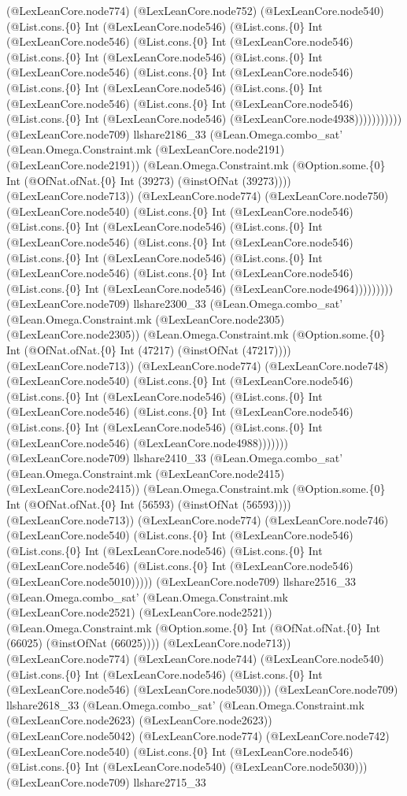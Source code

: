 \documentclass[11pt]{article}
\begin{document}
(@LexLeanCore.node774) (@LexLeanCore.node752) (@LexLeanCore.node540) (@List.cons.\{0\} Int (@LexLeanCore.node546) (@List.cons.\{0\} Int (@LexLeanCore.node546) (@List.cons.\{0\} Int (@LexLeanCore.node546) (@List.cons.\{0\} Int (@LexLeanCore.node546) (@List.cons.\{0\} Int (@LexLeanCore.node546) (@List.cons.\{0\} Int (@LexLeanCore.node546) (@List.cons.\{0\} Int (@LexLeanCore.node546) (@List.cons.\{0\} Int (@LexLeanCore.node546) (@List.cons.\{0\} Int (@LexLeanCore.node546) (@List.cons.\{0\} Int (@LexLeanCore.node546) (@LexLeanCore.node4938))))))))))) (@LexLeanCore.node709) llshare2186\_33 (@Lean.Omega.combo\_sat' (@Lean.Omega.Constraint.mk (@LexLeanCore.node2191) (@LexLeanCore.node2191)) (@Lean.Omega.Constraint.mk (@Option.some.\{0\} Int (@OfNat.ofNat.\{0\} Int (39273) (@instOfNat (39273)))) (@LexLeanCore.node713)) (@LexLeanCore.node774) (@LexLeanCore.node750) (@LexLeanCore.node540) (@List.cons.\{0\} Int (@LexLeanCore.node546) (@List.cons.\{0\} Int (@LexLeanCore.node546) (@List.cons.\{0\} Int (@LexLeanCore.node546) (@List.cons.\{0\} Int (@LexLeanCore.node546) (@List.cons.\{0\} Int (@LexLeanCore.node546) (@List.cons.\{0\} Int (@LexLeanCore.node546) (@List.cons.\{0\} Int (@LexLeanCore.node546) (@List.cons.\{0\} Int (@LexLeanCore.node546) (@LexLeanCore.node4964))))))))) (@LexLeanCore.node709) llshare2300\_33 (@Lean.Omega.combo\_sat' (@Lean.Omega.Constraint.mk (@LexLeanCore.node2305) (@LexLeanCore.node2305)) (@Lean.Omega.Constraint.mk (@Option.some.\{0\} Int (@OfNat.ofNat.\{0\} Int (47217) (@instOfNat (47217)))) (@LexLeanCore.node713)) (@LexLeanCore.node774) (@LexLeanCore.node748) (@LexLeanCore.node540) (@List.cons.\{0\} Int (@LexLeanCore.node546) (@List.cons.\{0\} Int (@LexLeanCore.node546) (@List.cons.\{0\} Int (@LexLeanCore.node546) (@List.cons.\{0\} Int (@LexLeanCore.node546) (@List.cons.\{0\} Int (@LexLeanCore.node546) (@List.cons.\{0\} Int (@LexLeanCore.node546) (@LexLeanCore.node4988))))))) (@LexLeanCore.node709) llshare2410\_33 (@Lean.Omega.combo\_sat' (@Lean.Omega.Constraint.mk (@LexLeanCore.node2415) (@LexLeanCore.node2415)) (@Lean.Omega.Constraint.mk (@Option.some.\{0\} Int (@OfNat.ofNat.\{0\} Int (56593) (@instOfNat (56593)))) (@LexLeanCore.node713)) (@LexLeanCore.node774) (@LexLeanCore.node746) (@LexLeanCore.node540) (@List.cons.\{0\} Int (@LexLeanCore.node546) (@List.cons.\{0\} Int (@LexLeanCore.node546) (@List.cons.\{0\} Int (@LexLeanCore.node546) (@List.cons.\{0\} Int (@LexLeanCore.node546) (@LexLeanCore.node5010))))) (@LexLeanCore.node709) llshare2516\_33 (@Lean.Omega.combo\_sat' (@Lean.Omega.Constraint.mk (@LexLeanCore.node2521) (@LexLeanCore.node2521)) (@Lean.Omega.Constraint.mk (@Option.some.\{0\} Int (@OfNat.ofNat.\{0\} Int (66025) (@instOfNat (66025)))) (@LexLeanCore.node713)) (@LexLeanCore.node774) (@LexLeanCore.node744) (@LexLeanCore.node540) (@List.cons.\{0\} Int (@LexLeanCore.node546) (@List.cons.\{0\} Int (@LexLeanCore.node546) (@LexLeanCore.node5030))) (@LexLeanCore.node709) llshare2618\_33 (@Lean.Omega.combo\_sat' (@Lean.Omega.Constraint.mk (@LexLeanCore.node2623) (@LexLeanCore.node2623)) (@LexLeanCore.node5042) (@LexLeanCore.node774) (@LexLeanCore.node742) (@LexLeanCore.node540) (@List.cons.\{0\} Int (@LexLeanCore.node546) (@List.cons.\{0\} Int (@LexLeanCore.node540) (@LexLeanCore.node5030))) (@LexLeanCore.node709) llshare2715\_33 
\end{document}
